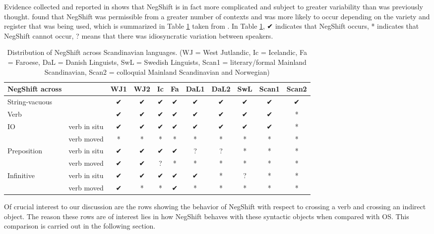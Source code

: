 \documentclass[12pt, letterpaper]{article}
\begin{document}
Evidence collected and reported in \citet{engelsMicrovariationObjectPositions2011,engelsScandinavianNegativeIndefinites2012} shows that NegShift is in fact more complicated and subject to greater variability than was previously thought. \citeauthor{engelsScandinavianNegativeIndefinites2012} found that NegShift was permissible from a greater number of contexts and was more likely to occur depending on the variety and register that was being used, which is summarized in Table \ref{tab:Distribution} taken from \citet{engelsScandinavianNegativeIndefinites2012}. In Table \ref{tab:Distribution}, ✔︎ indicates that NegShift occurs, * indicates that NegShift cannot occur, ? means that there was idiosyncratic variation between speakers.
\begin{table}[!ht]
	\centering
	\caption{Distribution of NegShift across Scandinavian languages. (WJ = West Jutlandic, Ic = Icelandic, Fa = Faroese, DaL = Danish Linguists, SwL = Swedish Linguists, Scan1 = literary/formal Mainland Scandinavian, Scan2 = colloquial Mainland Scandinavian and Norwegian)}
	\label{tab:Distribution}
\begin{tabular}{llccccccccc}
	\hline 
	NegShift across &  & WJ1 & WJ2 & Ic & Fa & DaL1 & DaL2 & SwL & Scan1 & Scan2 \\ 
	\hline 
	String-vacuous &  & ✔︎ & ✔︎ & ✔︎ & ✔︎ & ✔︎ & ✔︎ & ✔︎ & ✔︎ & ✔︎ \\ 
	Verb &  & ✔︎ & ✔︎ & ✔︎ & ✔︎ & ✔︎ & ✔︎ & ✔︎ & ✔︎ & * \\ 
	IO & verb in situ & ✔︎ & ✔︎ & ✔︎ & ✔︎ & ✔︎ & ✔︎ & ✔︎ & ✔︎ & * \\ 
	& verb moved & * & * & * & * & * & * & * & * & * \\ 
	Preposition & verb in situ & ✔︎ & ✔︎ & ✔︎ & ✔︎ & ? & ? & * & * & * \\ 
	& verb moved & ✔︎ & ✔︎ & ? & * & * & * & * & * & * \\ 
	Infinitive & verb in situ & ✔︎ & ✔︎ & ✔︎ & ✔︎ & ✔︎ & * & ? & * & * \\ 
	& verb moved & ✔︎ & * & * & ✔︎ & * & * & * & * & * \\ 
	\hline 
\end{tabular} 
\end{table}


Of crucial interest to our discussion are the rows showing the behavior of NegShift with respect to crossing a verb and crossing an indirect object.  The reason these rows are of interest lies in how NegShift behaves with these syntactic objects when compared with OS. This comparison is carried out in the following section.
\end{document}
